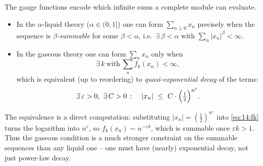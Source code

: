 \begin{remark}
\label{rmk:14:sums}
The gauge functions encode which infinite sums a complete module can evaluate.
\begin{itemize}
\item In the $\alpha$-liquid theory ($\alpha\in(0,1]$) one can form
$\sum_{n\ge 0} x_n$ precisely when the sequence is \emph{$\beta$-summable} for some
$\beta<\alpha$, i.e.\ $\exists\,\beta<\alpha$ with $\sum_n|x_n|^{\beta}<\infty$.
\item In the gaseous theory one can form $\sum_n x_n$ only when
\begin{equation*}
\exists\,k\ \text{with}\ \sum_n f_k(x_n)<\infty,
\end{equation*}
which is equivalent (up to reordering) to \emph{quasi-exponential decay} of the
terms:
\begin{equation}
\label{eq:14:quasi-exponential}
\exists\,\varepsilon>0,\ \exists\,C>0\ \colon\quad |x_n|\ \le\ C\cdot\Bigl(\tfrac12\Bigr)^{n^{\varepsilon}}.
\end{equation}
\end{itemize}
The equivalence is a direct computation: substituting $|x_n|=(\tfrac12)^{n^{\varepsilon}}$
into \eqref{eq:14:fk} turns the logarithm into $n^{\varepsilon}$, so
$f_k(x_n)\sim n^{-\varepsilon k}$, which is summable once $\varepsilon k>1$. Thus the
gaseous condition is a much stronger constraint on the summable sequences than any
liquid one -- one must have (nearly) exponential decay, not just power-law decay.
\end{remark}

\begin{center}
\end{center}

